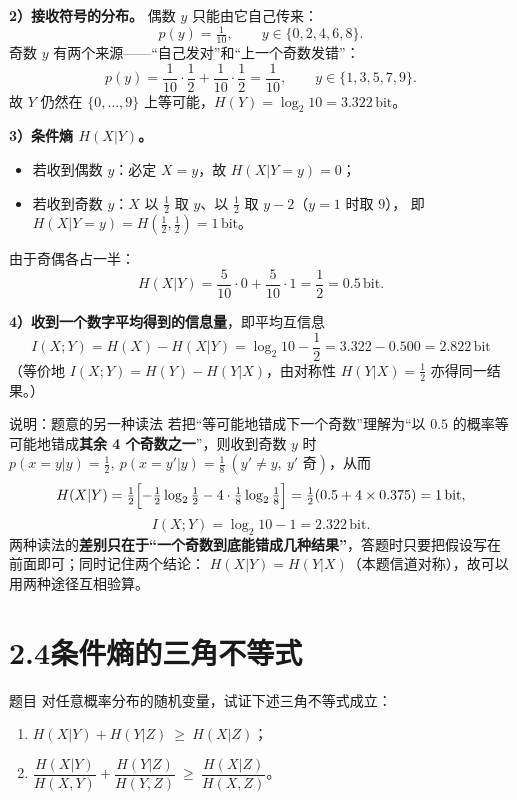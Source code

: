 \documentclass[11pt,a4paper]{ctexart}
\newcommand{\Hx}[1]{H\!\left(#1\right)}
\newcommand{\I}[1]{I\!\left(#1\right)}
\newcommand{\lb}{\log_{2}}
\newcommand{\bit}{\,\text{bit}}
\begin{document}
\textbf{2）接收符号的分布。} 偶数 $y$ 只能由它自己传来：
\[
p(y)=\tfrac{1}{10},\qquad y\in\{0,2,4,6,8\}.
\]
奇数 $y$ 有两个来源——“自己发对”和“上一个奇数发错”：
\[
p(y)=\frac1{10}\cdot\frac12+\frac1{10}\cdot\frac12=\frac{1}{10},\qquad y\in\{1,3,5,7,9\}.
\]
故 $Y$ 仍然在 $\{0,\dots,9\}$ 上等可能，$\Hx{Y}=\lb 10=3.322\bit$。

\textbf{3）条件熵 $\Hx{X|Y}$。}
\begin{itemize}[leftmargin=1.6em,itemsep=1pt,topsep=2pt]
  \item 若收到偶数 $y$：必定 $X=y$，故 $\Hx{X|Y=y}=0$；
  \item 若收到奇数 $y$：$X$ 以 $\tfrac12$ 取 $y$、以 $\tfrac12$ 取 $y-2$（$y=1$ 时取 $9$），
        即 $\Hx{X|Y=y}=\Hx{\tfrac12,\tfrac12}=1\bit$。
\end{itemize}
由于奇偶各占一半：
\[
\Hx{X|Y}=\frac{5}{10}\cdot 0+\frac{5}{10}\cdot 1=\frac12=0.5\bit .
\]

\textbf{4）收到一个数字平均得到的信息量}，即平均互信息
\[
\boxed{\ \I{X;Y}=\Hx{X}-\Hx{X|Y}=\lb 10-\frac12=3.322-0.500=2.822\bit\ }
\]
（等价地 $\I{X;Y}=\Hx{Y}-\Hx{Y|X}$，由对称性 $\Hx{Y|X}=\tfrac12$ 亦得同一结果。）

\begin{keypoint}{说明：题意的另一种读法}
若把“等可能地错成下一个奇数”理解为“以 $0.5$ 的概率等可能地错成\textbf{其余 4 个奇数之一}”，则收到奇数 $y$ 时
$p(x=y|y)=\tfrac12,\ p(x=y'|y)=\tfrac18\ (y'\neq y,\ y'\text{ 奇})$，从而
\[
\Hx{X|Y}=\tfrac12\Bigl[-\tfrac12\lb\tfrac12-4\cdot\tfrac18\lb\tfrac18\Bigr]
=\tfrac12(0.5+4\times0.375)=1\bit,
\]
\[
\I{X;Y}=\lb10-1=2.322\bit .
\]
两种读法的\textbf{差别只在于“一个奇数到底能错成几种结果”}，答题时只要把假设写在前面即可；同时记住两个结论：
$\Hx{X|Y}=\Hx{Y|X}$（本题信道对称），故可以用两种途径互相验算。
\end{keypoint}

\section*{2.4\quad 条件熵的三角不等式}

\begin{problem}{题目}
对任意概率分布的随机变量，试证下述三角不等式成立：
\begin{enumerate}[label=(\alph*),leftmargin=1.8em,itemsep=1pt,topsep=2pt]
  \item $\Hx{X|Y}+\Hx{Y|Z}\ \ge\ \Hx{X|Z}$；
  \item $\dfrac{\Hx{X|Y}}{\Hx{X,Y}}+\dfrac{\Hx{Y|Z}}{\Hx{Y,Z}}\ \ge\ \dfrac{\Hx{X|Z}}{\Hx{X,Z}}$。
\end{enumerate}
\end{problem}
\end{document}
